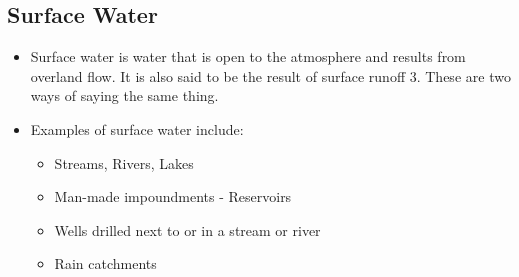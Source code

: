 \subsection{Surface Water}
\begin{itemize}
\item Surface water is water that is open to the atmosphere and results from overland flow. It is also said to be the result of surface runoff 3. These are two ways of saying the same thing.
\item Examples of surface water include:
\begin{itemize}
\item Streams, Rivers, Lakes
\item Man-made impoundments - Reservoirs
\item Wells drilled next to or in a stream or river
\item Rain catchments
\end{itemize}


\end{itemize}
